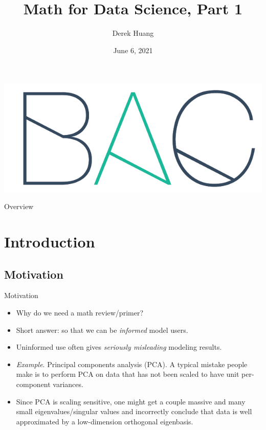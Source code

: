 \documentclass{beamer}
\title[Math for Data Science, Part 1]{Math for Data Science, Part 1}
\author[Derek Huang (BAC Advanced Team)]{Derek Huang}
\institute{BAC Advanced Team}
\date{June 6, 2021}
\numberwithin{equation}{section}
\begin{document}
\begin{frame}
    \titlepage
    \centering
    \includegraphics[scale = 0.1]{../bac_logo1.png}
\end{frame}

\begin{frame}{Overview}
	\tableofcontents
\end{frame}

\section{Introduction}

\subsection{Motivation}

\begin{frame}{Motivation}
    \begin{itemize}
        \item
        Why do we need a math review/primer?
        
        \item
        Short answer: so that we can be \textit{informed} model users.
        
        \item
        Uninformed use often gives \textit{seriously misleading} modeling
        results.

        \item
        \textit{Example}. Principal components analysis (PCA). A typical
        mistake people make\footnotemark{} is to perform PCA on data that has not been scaled to have unit
        per-component variances.

        \item
        Since PCA is scaling sensitive, one might get a couple massive
        and many small eigenvalues/singular values\footnotemark{} and incorrectly conclude that data is well approximated by a
        low-dimension orthogonal eigenbasis.
    \end{itemize}
\end{frame}
\end{document}
